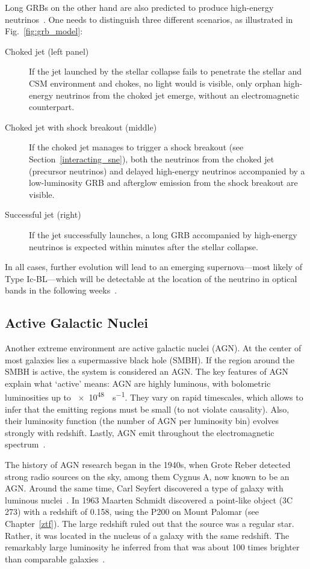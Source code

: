 Long GRBs on the other hand are also predicted to produce high-energy neutrinos~. One needs to distinguish three different scenarios, as illustrated in Fig.~\ref{fig:grb_model}:
\begin{description}
    \item[Choked jet (left panel)] If the jet launched by the stellar collapse fails to penetrate the stellar and CSM environment and chokes, no light would is visible, only orphan high-energy neutrinos from the choked jet emerge, without an electromagnetic counterpart.
    \item[Choked jet with shock breakout (middle)] If the choked jet manages to trigger a shock breakout (see Section~\ref{interacting_sne}), both the neutrinos from the choked jet (precursor neutrinos) and delayed high-energy neutrinos accompanied by a low-luminosity GRB and afterglow emission from the shock breakout are visible.
    \item[Successful jet (right)] If the jet successfully launches, a long GRB accompanied by high-energy neutrinos is expected within minutes after the stellar collapse.
\end{description}

In all cases, further evolution will lead to an emerging supernova---most likely of Type Ic-BL---which will be detectable at the location of the neutrino in optical bands in the following weeks~.

\subsection{Active Galactic Nuclei}\label{agn}
Another extreme environment are active galactic nuclei (AGN). At the center of most galaxies lies a supermassive black hole (SMBH). If the region around the SMBH is active, the system is considered an AGN. The key features of AGN explain what `active' means: AGN are highly luminous, with bolometric luminosities up to \SI{e48}{\erg\per\s}. They vary on rapid timescales, which allows to infer that the emitting regions must be small (to not violate causality). Also, their luminosity function (the number of AGN per luminosity bin) evolves strongly with redshift. Lastly, AGN emit throughout the electromagnetic spectrum~.

The history of AGN research began in the 1940s, when Grote Reber detected strong radio sources on the sky, among them Cygnus A, now known to be an AGN. Around the same time, Carl Seyfert discovered a type of galaxy with luminous nuclei~. In 1963 Maarten Schmidt discovered a point-like object (3C 273) with a redshift of 0.158, using the P200 on Mount Palomar (see Chapter~\ref{ztf}). The large redshift ruled out that the source was a regular star. Rather, it was located in the nucleus of a galaxy with the same redshift. The remarkably large luminosity he inferred from that was about 100 times brighter than comparable galaxies~.

